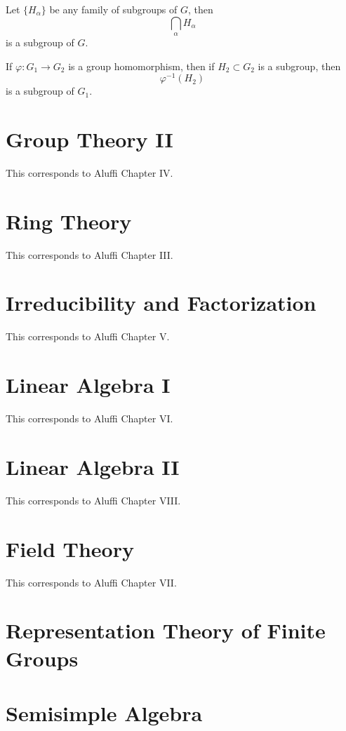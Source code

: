 \documentclass[openany]{book}
\begin{document}
\begin{prop}
    Let $\{H_\alpha\}$ be any family of subgroups of $G$, then 
    \begin{equation*}
        \bigcap_\alpha H_\alpha
    \end{equation*}
    is a subgroup of $G$.
\end{prop}

\begin{prop}
    If $\varphi: G_1\to G_2$ is a group homomorphism, then if $H_2\subset G_2$ is a subgroup, then 
    \begin{equation*}
        \varphi^{-1}(H_2)
    \end{equation*}
    is a subgroup of $G_1$.
\end{prop}









\chapter{Group Theory II}
This corresponds to Aluffi Chapter IV.

\chapter{Ring Theory}
This corresponds to Aluffi Chapter III.


\chapter{Irreducibility and Factorization}
This corresponds to Aluffi Chapter V.

\chapter{Linear Algebra I}
This corresponds to Aluffi Chapter VI.

\chapter{Linear Algebra II}
This corresponds to Aluffi Chapter VIII.

\chapter{Field Theory}
This corresponds to Aluffi Chapter VII.

\chapter{Representation Theory of Finite Groups}

\chapter{Semisimple Algebra}


\newpage
\end{document}
